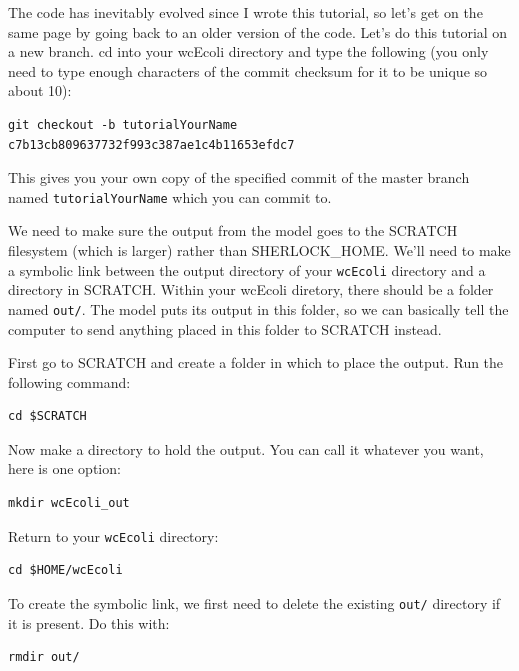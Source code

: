 \documentclass[12pt]{article}
\begin{document}
The code has inevitably evolved since I wrote this tutorial, so let's get on the same page by going back to an older version of the code. Let's do this tutorial on a new branch. cd into your wcEcoli directory and type the following (you only need to type enough characters of the commit checksum for it to be unique so about 10):

\lstset{language=bash}
\begin{lstlisting}
git checkout -b tutorialYourName c7b13cb809637732f993c387ae1c4b11653efdc7
\end{lstlisting}

This gives you your own copy of the specified commit of the master branch named \texttt{tutorialYourName} which you can commit to.

We need to make sure the output from the model goes to the SCRATCH filesystem (which is larger) rather than SHERLOCK\_HOME. We'll need to make a symbolic link between the output directory of your \texttt{wcEcoli} directory and a directory in SCRATCH. Within your wcEcoli diretory, there should be a folder named \texttt{out/}. The model puts its output in this folder, so we can basically tell the computer to send anything placed in this folder to SCRATCH instead.

First go to SCRATCH and create a folder in which to place the output. Run the following command:

\lstset{language=bash}
\begin{lstlisting}
cd $SCRATCH
\end{lstlisting}

Now make a directory to hold the output. You can call it whatever you want, here is one option:

\lstset{language=bash}
\begin{lstlisting}
mkdir wcEcoli_out
\end{lstlisting}

Return to your \texttt{wcEcoli} directory:

\lstset{language=bash}
\begin{lstlisting}
cd $HOME/wcEcoli
\end{lstlisting}

To create the symbolic link, we first need to delete the existing \texttt{out/} directory if it is present. Do this with:

\lstset{language=bash}
\begin{lstlisting}
rmdir out/
\end{lstlisting}
\end{document}
